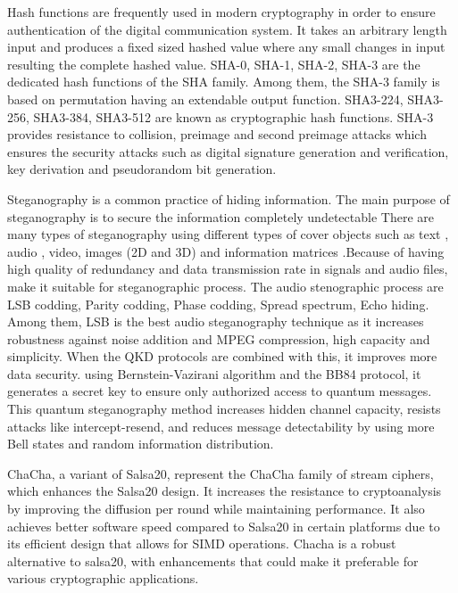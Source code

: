 \documentclass{article}
\begin{document}
Hash functions are frequently used in modern cryptography in order to ensure authentication of the digital communication system. It takes an arbitrary length input and produces a fixed sized hashed value where any small changes in input resulting the complete hashed value. SHA-0, SHA-1, SHA-2, SHA-3 are the dedicated hash functions of the SHA family.\cite{madhuravani2013cryptographic} Among them, the SHA-3 family is based on permutation having an extendable output function. SHA3-224, SHA3-256, SHA3-384, SHA3-512 are known as cryptographic hash functions. SHA-3 provides resistance to collision, preimage and second preimage attacks which ensures the security attacks such as digital signature generation and verification, key derivation and pseudorandom bit generation. \cite{dworkin2015sha}

Steganography is a common practice of hiding information. The main purpose of steganography is to secure the information completely undetectable\cite{amin2003information} There are many types of steganography using different types of cover objects such as text \cite{yang2018rnn}, audio \cite{jayaram2011information}\cite{hemeida2021comparative}\cite{djebbar2012comparative}, video, images (2D and 3D) \cite{farrag2020secure} and information matrices \cite{mashaly2019multiple}.Because of having high quality of redundancy and data transmission rate in signals and audio files, make it suitable for steganographic process.\cite{singh2014survey} The audio stenographic process are LSB codding, Parity codding, Phase codding, Spread spectrum, Echo hiding. Among them, LSB is the best audio steganography technique as it increases robustness against noise addition and MPEG compression, high capacity and simplicity.\cite{cvejic2004increasing}\cite{jayaram2011information}  When the QKD protocols are combined with this, it improves more data security. using  Bernstein-Vazirani algorithm and the BB84 protocol, it generates a secret key to ensure only authorized access to quantum messages. This quantum steganography method increases hidden channel capacity, resists attacks like intercept-resend, and reduces message detectability by using more Bell states and random information distribution.\cite{yalla2022novel}

ChaCha, a variant of Salsa20, represent the ChaCha family of stream ciphers, which enhances the Salsa20 design. It increases the resistance to cryptoanalysis by improving the diffusion per round while maintaining performance. It also achieves better software speed compared to Salsa20 in certain platforms due to its efficient design that allows for SIMD operations.\cite{bernstein2008chacha} Chacha is a robust alternative to salsa20, with enhancements that could make it preferable for various cryptographic applications.
\end{document}
